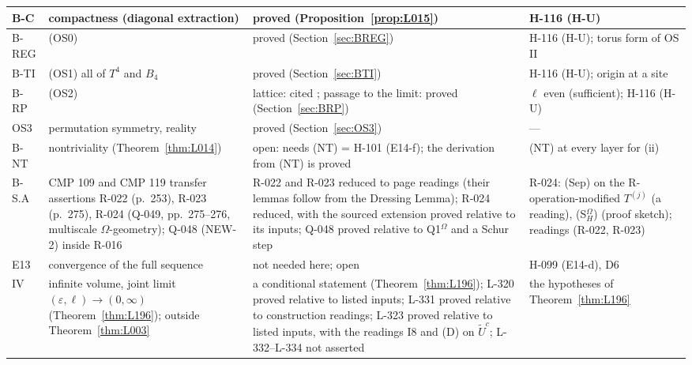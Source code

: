 \begin{longtable}{|p{1.3cm}|p{3.3cm}|p{6.2cm}|p{3.6cm}|}
B-C & compactness (diagonal extraction) & proved (Proposition~\ref{prop:L015}) & H-116 (H-U) \\ \hline
B-REG & (OS0) & proved (Section~\ref{sec:BREG}) & H-116 (H-U); torus form of OS II \\ \hline
B-TI & (OS1) all of $T^4$ and $B_4$ & proved (Section~\ref{sec:BTI}) & H-116 (H-U); origin at a site \\ \hline
B-RP & (OS2) & lattice: cited \cite{osterwalderseiler1978}; passage to the limit: proved (Section~\ref{sec:BRP}) & $\ell$ even (sufficient); H-116 (H-U) \\ \hline
OS3 & permutation symmetry, reality & proved (Section~\ref{sec:OS3}) & --- \\ \hline
B-NT & nontriviality (Theorem~\ref{thm:L014}) & open: needs (NT) = H-101 (E14-f); the derivation from (NT) is proved & (NT) at every layer for (ii) \\ \hline
B-S.A & CMP 109 and CMP 119 transfer assertions R-022 (p.~253), R-023 (p.~275), R-024 (Q-049, pp.~275--276, multiscale $\Omega$-geometry); Q-048 (NEW-2) inside R-016 & R-022 and R-023 reduced to page readings (their lemmas follow from the Dressing Lemma); R-024 reduced, with the sourced extension proved relative to its inputs; Q-048 proved relative to Q1$^\Omega$ and a Schur step & R-024: (Sep) on the R-operation-modified $T^{(j)}$ (a reading), (S$_H^\Omega$) (proof sketch); readings (R-022, R-023) \\ \hline
E13 & convergence of the full sequence & not needed here; open & H-099 (E14-d), D6 \\ \hline
IV & infinite volume, joint limit $(\varepsilon,\ell)\to(0,\infty)$ (Theorem~\ref{thm:L196}); outside Theorem~\ref{thm:L003} & a conditional statement (Theorem~\ref{thm:L196}); L-320 proved relative to listed inputs; L-331 proved relative to construction readings; L-323 proved relative to listed inputs, with the readings I8 and (D) on $\tilde U^c$; L-332--L-334 not asserted & the hypotheses of Theorem~\ref{thm:L196} \\ \hline
\end{longtable}
\endgroup


